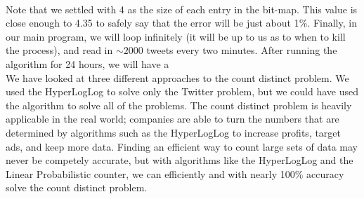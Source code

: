 \documentclass{article}
\begin{document}
\noindent \\
Note that we settled with 4 as the size of each entry in the bit-map. This value is close enough to 4.35 to safely say that the error will be just about 1\%.
Finally, in our main program, we will loop infinitely (it will be up to us as to when to kill the process), and read in $\sim 2000$ tweets every two minutes. 
After running the algorithm for 24 hours, we will have a\\ 
\indent We have looked at three different approaches to the count distinct problem. 
We used the HyperLogLog to solve only the Twitter problem, but we could have used the algorithm to solve all of the problems. 
The count distinct problem is heavily applicable in the real world; companies are able to turn the numbers that are determined by algorithms such as the HyperLogLog to increase profits, target ads, and keep more data.
Finding an efficient way to count large sets of data may never be competely accurate, but with algorithms like the HyperLogLog and the Linear Probabilistic counter, we can efficiently and with nearly 100\% accuracy solve the count distinct problem.
\end{document}
